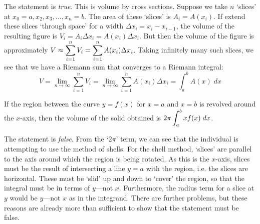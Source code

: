 \documentclass[11pt,letterpaper]{article}
\begin{document}
\sol The statement is \textit{true}. This is volume by cross sections. Suppose we take $n$ `slices' at $x_0= a, x_2, x_3, \ldots, x_n= b$. The area of these `slices' is $A_i= A(x_i)$. If extend these slices `through space' for a width $\Delta x_i= x_i - x_{i - 1}$, the volume of the resulting figure is $V_i= A_i \Delta x_i= A(x_i) \Delta x_i$. But then the volume of the figure is approximately $\displaystyle V \approx \sum_{i=1}^n V_i= \sum_{i=1}^n A(x_i) \Delta x_i$. Taking infinitely many such slices, we see that we have a Riemann sum that converges to a Riemann integral:
	\[
	V= \lim_{n \to \infty} \sum_{i=1}^n V_i= \lim_{n \to \infty} \sum_{i=1}^n A(x_i) \Delta x_i= \int_a^b A(x) \;dx
	\] 



\newpage



 If the region between the curve $y= f(x)$ for $x= a$ and $x= b$ is revolved around the $x$-axis, then the volume of the solid obtained is $\displaystyle 2\pi\int_a^b x f(x) \;dx$. \pspace

\sol The statement is \textit{false}. From the `$2\pi$' term, we can see that the individual is attempting to use the method of shells. For the shell method, `slices' are parallel to the axis around which the region is being rotated. As this is the $x$-axis, slices must be the result of intersecting a line $y= a$ with the region, i.e. the slices are horizontal. These must be `slid' up and down to `cover' the region, so that the integral must be in terms of $y$---not $x$. Furthermore, the radius term for a slice at $y$ would be $y$---not $x$ as in the integrand. There are further problems, but these reasons are already more than sufficient to show that the statement must be false. 
\end{document}
